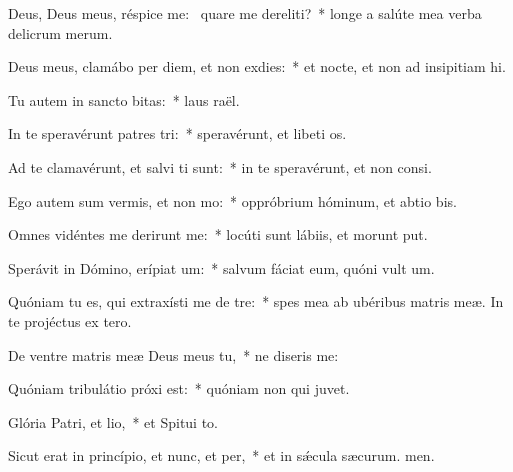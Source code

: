 \item Deus, Deus meus, réspice  me:~\pscross{} quare me dereliti?~* longe a salúte mea verba delicrum merum.
\item Deus meus, clamábo per diem, et non exdies:~* et nocte, et non ad insipitiam hi.
\item Tu autem in sancto bitas:~* laus raël.
\item In te speravérunt patres tri:~* speravérunt, et libeti os.
\item Ad te clamavérunt, et salvi ti sunt:~* in te speravérunt, et non  consi.
\item Ego autem sum vermis, et non mo:~* oppróbrium hóminum, et abtio bis.
\item Omnes vidéntes me derirunt me:~* locúti sunt lábiis, et morunt put.
\item Sperávit in Dómino, erípiat um:~* salvum fáciat eum, quóni vult um.
\item Quóniam tu es, qui extraxísti me de tre:~* spes mea ab ubéribus matris meæ. In te projéctus  ex tero.
\item De ventre matris meæ Deus meus  tu,~* ne diseris  me:
\item Quóniam tribulátio próxi est:~* quóniam non  qui juvet.
\item Glória Patri, et lio,~* et Spitui to.
\item Sicut erat in princípio, et nunc, et per,~* et in sǽcula sæcurum. men.

